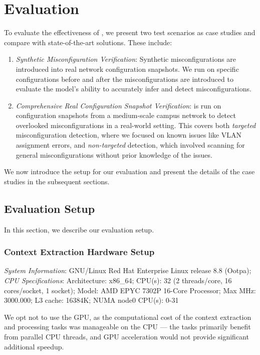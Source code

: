 \section{Evaluation}
\label{sec:eval}
To evaluate the effectiveness of \sysname{}, we present two test scenarios as case studies and compare \sysname{} with state-of-the-art solutions. These include:

\begin{enumerate}
    \item \textit{Synthetic Misconfiguration Verification}: Synthetic misconfigurations are introduced into real network configuration snapshots. We run \sysname{} on specific configurations before and after the misconfigurations are introduced to evaluate the model’s ability to accurately infer and detect misconfigurations.
    \item \textit{Comprehensive Real Configuration Snapshot Verification}: \sysname{} is run on configuration snapshots from a medium-scale campus network to detect overlooked misconfigurations in a real-world setting. This covers both \textit{targeted} misconfiguration detection, where we focused on known issues like VLAN assignment errors, and \textit{non-targeted} detection, which involved scanning for general misconfigurations without prior knowledge of the issues.
\end{enumerate}

We now introduce the setup for our evaluation and present the details of the case studies in the subsequent sections.


\subsection{Evaluation Setup}

In this section, we describe our evaluation setup.

\subsubsection{Context Extraction Hardware Setup}


\textit{System Information}: GNU/Linux Red Hat Enterprise Linux release 8.8 (Ootpa); 
\textit{CPU Specifications}: Architecture: x86\_64; CPU(s): 32 (2 threads/core, 16 cores/socket, 1 socket); Model: AMD EPYC 7302P 16-Core Processor; Max MHz: 3000.000; L3 cache: 16384K; NUMA node0 CPU(s): 0-31 

We opt not to use the GPU, as the computational cost of the context extraction and processing tasks was manageable on the CPU --- the tasks primarily benefit from parallel CPU threads, and GPU acceleration would not provide significant additional speedup.


